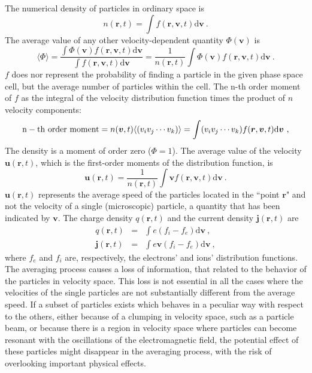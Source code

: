 \documentclass[12pt,a4paper]{article}
\renewcommand{\vec}[1]{\boldsymbol{#1}}
\newcommand{\dif}{\mathrm{d}}
\begin{document}
The numerical density of particles in ordinary space is
\begin{equation}
n(\vec{r}, t) = \int f(\vec{r}, \vec{v}, t) \dif \vec{v} ~.
\end{equation}
The average value of any other velocity-dependent quantity $\Phi(\vec{v})$ is
\begin{equation*}
\langle \Phi \rangle = \frac{\int \Phi(\vec{v}) f(\vec{r}, \vec{v}, t) \dif \vec{v}}{\int f(\vec{r}, \vec{v}, t) \dif \vec{v}} = \frac{1}{n(\vec{r}, t)} \int \Phi(\vec{v}) f(\vec{r}, \vec{v}, t) \dif \vec{v} ~.
\end{equation*}
$f$ does nor represent the probability of finding a particle in the given phase space cell, but the average number of particles within the cell. The n-th order moment of $f$ as the integral of the velocity distribution function times the product of $n$ velocity components:
\begin{equation*}
{\rm n-th ~order ~moment} = n(\vec{v}, t) \langle (v_i v_j \cdots v_k) \rangle = \int (v_i v_j \cdots v_k) f(\vec{r}, \vec{v}, t) \dif \vec{v} ~,
\end{equation*}
The density is a moment of order zero ($\Phi = 1$). The average value of the velocity $\vec{u}(\vec{r}, t)$, which is the first-order moments of the distribution function, is 
\begin{equation}
\vec{u}(\vec{r}, t) = \frac{1}{n(\vec{r}, t)} \int \vec{v} f(\vec{r}, \vec{v}, t) \dif \vec{v} ~.
\end{equation}
$\vec{u}(\vec{r}, t)$ represents the average speed of the particles located in the ``point $\vec{r}$" and not the velocity of a single (microscopic) particle, a quantity that has been indicated by $\vec{v}$. The charge density $q(\vec{r}, t)$ and the current density $\vec{j}(\vec{r}, t)$ are
\begin{eqnarray}
q(\vec{r}, t) &=& \int e(f_i -f_e) \dif \vec{v} ~, \\
\vec{j}(\vec{r}, t) &=& \int e\vec{v}(f_i -f_e) \dif \vec{v} ~,
\end{eqnarray}
where $f_e$ and $f_i$ are, respectively, the electrons' and ions' distribution functions. The averaging process causes a loss of information, that related to the behavior of the particles in velocity space. This loss is not essential in all the cases where the velocities of the single particles are not substantially different from the average speed. If a subset of particles exists which behaves in a peculiar way with respect to the others, either because of a clumping in velocity space, such as a particle beam, or because there is a region in velocity space where particles can become resonant with the oscillations of the electromagnetic field, the potential effect of these particles might disappear in the averaging process, with the risk of overlooking important physical effects. 
\end{document}
